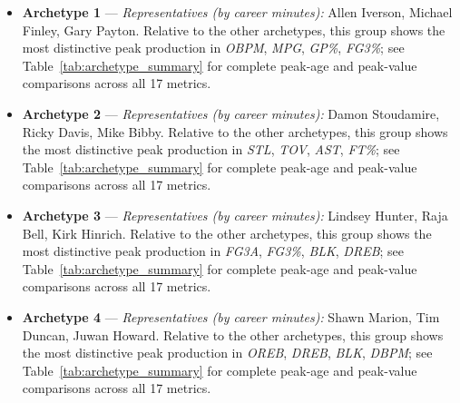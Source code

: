 \begin{itemize}
\item \textbf{Archetype 1} --- \emph{Representatives (by career minutes):} Allen Iverson, Michael Finley, Gary Payton. Relative to the other archetypes, this group shows the most distinctive peak production in \textit{OBPM}, \textit{MPG}, \textit{GP\%}, \textit{FG3\%}; see Table~\ref{tab:archetype_summary} for complete peak-age and peak-value comparisons across all 17 metrics.
\item \textbf{Archetype 2} --- \emph{Representatives (by career minutes):} Damon Stoudamire, Ricky Davis, Mike Bibby. Relative to the other archetypes, this group shows the most distinctive peak production in \textit{STL}, \textit{TOV}, \textit{AST}, \textit{FT\%}; see Table~\ref{tab:archetype_summary} for complete peak-age and peak-value comparisons across all 17 metrics.
\item \textbf{Archetype 3} --- \emph{Representatives (by career minutes):} Lindsey Hunter, Raja Bell, Kirk Hinrich. Relative to the other archetypes, this group shows the most distinctive peak production in \textit{FG3A}, \textit{FG3\%}, \textit{BLK}, \textit{DREB}; see Table~\ref{tab:archetype_summary} for complete peak-age and peak-value comparisons across all 17 metrics.
\item \textbf{Archetype 4} --- \emph{Representatives (by career minutes):} Shawn Marion, Tim Duncan, Juwan Howard. Relative to the other archetypes, this group shows the most distinctive peak production in \textit{OREB}, \textit{DREB}, \textit{BLK}, \textit{DBPM}; see Table~\ref{tab:archetype_summary} for complete peak-age and peak-value comparisons across all 17 metrics.
\end{itemize}
